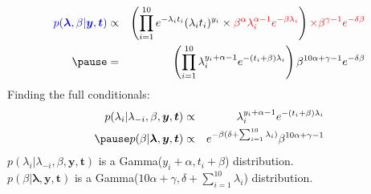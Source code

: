\documentclass[handout]{beamer}
\begin{document}
\begin{frame}
\begin{eqnarray*}
\blue{p(\bm{\lambda}, \beta | \bm{y}, \bm{t})} &\propto& \left(
\prod_{i=1}^{10} e^{-\lambda_i t_i} (\lambda_i t_i)^{y_i} \times
\red{\beta^{\alpha} \lambda_i^{\alpha-1} e^{-\beta \lambda_i}} \right) \red{\times 
\beta^{\gamma-1} e^{-\delta \beta} }\\
\pause
&=& \left( \prod_{i=1}^{10} \lambda_i^{y_i + \alpha - 1} e^{-(t_i +
\beta)\lambda_i} \right) \beta^{10\alpha + \gamma - 1} e^{-\delta \beta}\\
\end{eqnarray*}
\pause
\medskip
Finding the full conditionals:
\pause
\begin{eqnarray*}
p(\lambda_i | \lambda_{-i}, \beta, \bm{y}, \bm{t}) &\propto& \lambda_i^{y_i + \alpha - 1} e^{-(t_i +
\beta)\lambda_i} \\
\pause
p(\beta | \bm{\lambda}, \bm{y}, \bm{t}) &\propto&  e^{-\beta
(\delta + \sum_{i=1}^{10} \lambda_i)} \beta^{10\alpha + \gamma - 1}\\
\end{eqnarray*}
\pause
$p(\lambda_i | \lambda_{-i}, \beta, \bm{y}, \bm{t})$ is a Gamma($y_i + \alpha, t_i + \beta$) distribution.\\
\pause
\bigskip
$p(\beta | \bm{\lambda}, \bm{y}, \bm{t})$ is a Gamma($10\alpha + \gamma, \delta + \sum_{i=1}^{10}
\lambda_i$) distribution.
\end{frame}
\end{document}
